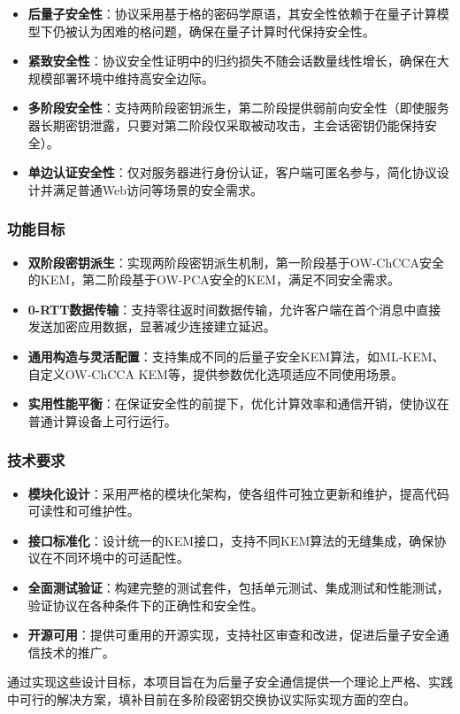 \begin{itemize}
    \item \textbf{后量子安全性}：协议采用基于格的密码学原语，其安全性依赖于在量子计算模型下仍被认为困难的格问题，确保在量子计算时代保持安全性。
    
    \item \textbf{紧致安全性}：协议安全性证明中的归约损失不随会话数量线性增长，确保在大规模部署环境中维持高安全边际。
    
    \item \textbf{多阶段安全性}：支持两阶段密钥派生，第二阶段提供弱前向安全性（即使服务器长期密钥泄露，只要对第二阶段仅采取被动攻击，主会话密钥仍能保持安全）。
    
    \item \textbf{单边认证安全性}：仅对服务器进行身份认证，客户端可匿名参与，简化协议设计并满足普通Web访问等场景的安全需求。
\end{itemize}

\subsubsection{功能目标}

\begin{itemize}
    \item \textbf{双阶段密钥派生}：实现两阶段密钥派生机制，第一阶段基于OW-ChCCA安全的KEM，第二阶段基于OW-PCA安全的KEM，满足不同安全需求。
    
    \item \textbf{0-RTT数据传输}：支持零往返时间数据传输，允许客户端在首个消息中直接发送加密应用数据，显著减少连接建立延迟。
    
    \item \textbf{通用构造与灵活配置}：支持集成不同的后量子安全KEM算法，如ML-KEM、自定义OW-ChCCA KEM等，提供参数优化选项适应不同使用场景。
    
    \item \textbf{实用性能平衡}：在保证安全性的前提下，优化计算效率和通信开销，使协议在普通计算设备上可行运行。
\end{itemize}

\subsubsection{技术要求}

\begin{itemize}
    \item \textbf{模块化设计}：采用严格的模块化架构，使各组件可独立更新和维护，提高代码可读性和可维护性。
    
    \item \textbf{接口标准化}：设计统一的KEM接口，支持不同KEM算法的无缝集成，确保协议在不同环境中的可适配性。
    
    \item \textbf{全面测试验证}：构建完整的测试套件，包括单元测试、集成测试和性能测试，验证协议在各种条件下的正确性和安全性。
    
    \item \textbf{开源可用}：提供可重用的开源实现，支持社区审查和改进，促进后量子安全通信技术的推广。
\end{itemize}

通过实现这些设计目标，本项目旨在为后量子安全通信提供一个理论上严格、实践中可行的解决方案，填补目前在多阶段密钥交换协议实际实现方面的空白。